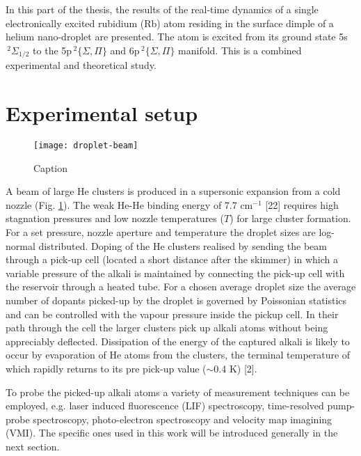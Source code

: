 	In this part of the thesis, the results of the real-time dynamics of a single electronically excited rubidium (Rb) atom residing in the surface dimple of a helium nano-droplet are presented. The atom is excited from its ground state 5s$\,^2\Sigma_{1/2}$ to the 5p$\,^2\{\Sigma,\Pi\}$ and 6p$\,^2\{\Sigma,\Pi\}$ manifold. This is a combined experimental and theoretical study.
	
	\section{Experimental setup}

		\begin{figure}[t]
			\begin{center}
				\texttt{[image: droplet-beam]}
				\caption{Caption}
				\label{fig:droplet-beam}
			\end{center}
		\end{figure}
		
		A beam of large He clusters is produced in a supersonic expansion from a cold nozzle (Fig. \ref{fig:droplet-beam}). The weak He-He binding energy of 7.7 cm$^{-1}$ [22] requires high stagnation pressures and low nozzle temperatures ($T$) for large cluster formation. For a set pressure, nozzle aperture and temperature the droplet sizes are log-normal distributed. Doping of the He clusters realised by sending the beam through a pick-up cell (located a short distance after the skimmer) in which a variable pressure of the alkali is maintained by connecting the pick-up cell with the reservoir through a heated tube. For a chosen average droplet size the average number of dopants picked-up by the droplet is governed by Poissonian statistics and can be controlled with the vapour pressure inside the pickup cell. In their path through the cell the larger clusters pick up alkali atoms without being appreciably deflected. Dissipation of the energy of the captured alkali is likely to occur by evaporation of He atoms from the clusters, the terminal temperature of which rapidly returns to its pre pick-up value ($\sim$0.4 K) [2].
	
		To probe the picked-up alkali atoms a variety of measurement techniques can be employed, e.g. laser induced fluorescence (LIF) spectroscopy, time-resolved pump-probe spectroscopy, photo-electron spectroscopy and velocity map imagining (VMI). The specific ones used in this work will be introduced generally in the next section.%